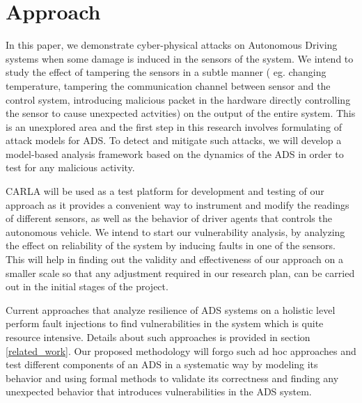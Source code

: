 \section{Approach}
In this paper, we demonstrate cyber-physical attacks on Autonomous Driving systems when some damage is induced in the sensors of the system. We intend to study the effect of tampering the sensors in a subtle manner ( eg. changing temperature, tampering the communication channel between sensor and the control system, introducing malicious packet in the hardware directly controlling the sensor to cause unexpected actvities) on the output of the entire system. This is an unexplored area and the first step in this research involves formulating of attack models for ADS. To detect and mitigate such attacks, we will develop a model-based analysis framework based on the dynamics of the ADS in order to test for any malicious activity.



CARLA will be used as a test platform for development and testing of our approach as it provides a convenient way to instrument and modify the readings of different sensors, as well as the behavior of driver agents that controls the autonomous vehicle. We intend to start our vulnerability analysis, by analyzing the effect on reliability of the system by inducing faults in one of the sensors. This will help in finding out the validity and effectiveness of our approach on a smaller scale so that any adjustment required in our research plan, can be carried out in the initial stages of the project. 

Current approaches that analyze resilience of ADS systems on a holistic level perform fault injections to find vulnerabilities in the system which is quite resource intensive. Details about such approaches is provided in section \ref{related_work}. Our proposed methodology will forgo such ad hoc approaches and test different components of an ADS in a systematic way by modeling its behavior and using formal methods to validate its correctness and finding any unexpected behavior that introduces vulnerabilities in the ADS system. 